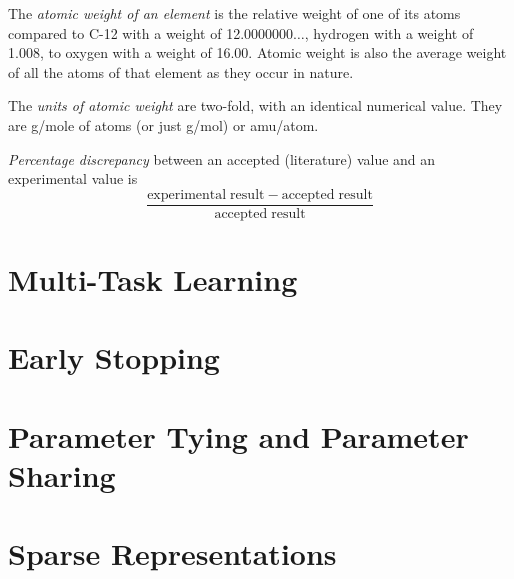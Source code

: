 \documentclass{article}
\begin{document}
\begin{enumerate}
\begin{item}
The \emph{atomic weight of an element} is the relative weight of one of its atoms compared to C-12 with a weight of 12.0000000$\ldots$, hydrogen with a weight of 1.008, to oxygen with a weight of 16.00. Atomic weight is also the average weight of all the atoms of that element as they occur in nature.
\end{item}
\begin{item}
The \emph{units of atomic weight} are two-fold, with an identical numerical value. They are g/mole of atoms (or just g/mol) or amu/atom.
\end{item}
\begin{item}
\emph{Percentage discrepancy} between an accepted (literature) value and an experimental value is
\begin{equation*}
\frac{\mathrm{experimental\;result} - \mathrm{accepted\;result}}{\mathrm{accepted\;result}}
\end{equation*}
\end{item}
\end{enumerate}


\section{Multi-Task Learning}


\section{Early Stopping}

\section{Parameter Tying and Parameter Sharing}


\section{Sparse Representations}
\end{document}
